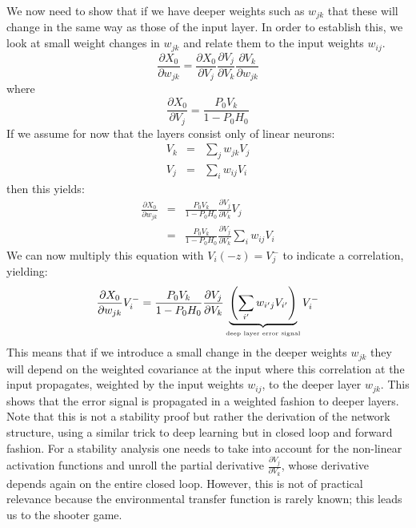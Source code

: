 \documentclass[Afour,sageh,times]{sagej}
\begin{document}
We now need to show that if we have deeper weights such as $w_{jk}$
that these will change in the same way as those of the input layer. In
order to establish this, we look at small weight changes in $w_{jk}$
and relate them to the input weights $w_{ij}$.
\begin{equation}
    \frac{\partial X_0}{\partial w_{jk}} =
    \frac{\partial X_0}{\partial V_j}
    \frac{\partial V_j}{\partial V_k}
    \frac{\partial V_k}{\partial w_{jk}}
\end{equation}    
where
\begin{equation}
\frac{\partial X_0}{\partial V_j} = \frac{P_0 V_k}{1-P_0 H_0}
\end{equation}
If we assume for now that the layers consist only of linear neurons:
\begin{eqnarray}
  V_k &=& \sum_j w_{jk} V_j \\
  V_j &=& \sum_i w_{ij} V_i
\end{eqnarray}
then this yields:
\begin{eqnarray}
    \frac{\partial X_0}{\partial w_{jk}} &=&
    \frac{P_0 V_k}{1-P_0 H_0}
    \frac{\partial V_j}{\partial V_k}
    V_j \\
                                        &=&
    \frac{P_0 V_k}{1-P_0 H_0}
    \frac{\partial V_j}{\partial V_k}
    \sum_i w_{ij} V_i
\end{eqnarray}    
  We can now multiply this equation with $V_i(-z)=V_j^-$ to indicate a correlation, yielding:
\begin{equation}
    \frac{\partial X_0}{\partial w_{jk}} V_i^- =   
    \frac{P_0 V_k}{1-P_0 H_0}
    \frac{\partial V_j}{\partial V_k}
    \underbrace{\left( \sum_{i^\prime} w_{i^\prime j} V_{i^\prime} \right)}_\textrm{\tiny deep layer error signal} V_i^-
\end{equation}
This means that if we introduce a small change in the deeper weights
$w_{jk}$ they will depend on the weighted covariance at the input
where this correlation at the input propagates, weighted by the input
weights $w_{ij}$, to the deeper layer $w_{jk}$. This shows that the
error signal is propagated in a weighted fashion to deeper
layers. Note that this is not a stability proof but rather the
derivation of the network structure, using a similar trick to deep
learning but in closed loop and forward fashion. For a stability
analysis one needs to take into account for the non-linear activation
functions and unroll the partial derivative $\frac{\partial
  V_j}{\partial V_k}$, whose derivative depends again on the entire
closed loop. However, this is not of practical relevance because the
environmental transfer function is rarely known; this leads us to
the shooter game.
\end{document}
